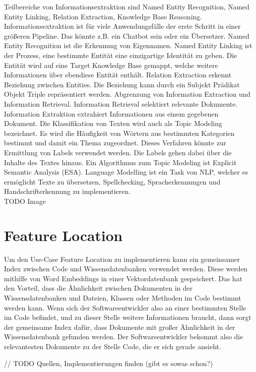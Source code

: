 Teilbereiche von Informationsextraktion sind Named Entity Recognition, Named Entity Linking, Relation Extraction, Knowledge Base Reasoning.
Informationsextraktion ist für viele Anwendungsfälle der erste Schritt in einer größeren Pipeline.
Das könnte z.B. ein Chatbot sein oder ein Übersetzer.
Named Entity Recognition ist die Erkennung von Eigennamen.
Named Entity Linking ist der Prozess, eine bestimmte Entität eine einzigartige Identität zu geben.
Die Entität wird auf eine Target Knowledge Base gemappt, welche weitere Informationen über ebendiese Entität enthält.
Relation Extraction erkennt Beziehung zwischen Entities.
Die Beziehung kann durch ein Subjekt Prädikat Objekt Triple repräsentiert werden.
Abgrenzung von Information Extraction und Information Retrieval.
Information Retrieval selektiert relevante Dokumente.
Information Extraktion extrahiert Informationen aus einem gegebenen Dokument.
Die Klassifikation von Texten wird auch als Topic Modeling bezeichnet.
Es wird die Häufigkeit von Wörtern aus bestimmten Kategorien bestimmt und damit ein Thema zugeordnet.
Dieses Verfahren könnte zur Ermittlung von Labels verwendet werden.
Die Labels gehen dabei über die Inhalte des Textes hinaus.
Ein Algorithmus zum Topic Modeling ist Explicit Semantic Analysis (ESA).
Language Modelling ist ein Task von NLP, welcher es ermöglicht Texte zu übersetzen, Spellchecking, Spracherkennungen und Handschrifterkennung zu implementieren.\\

TODO Image

\section{Feature Location}

Um den Use-Case Feature Location zu implementieren kann ein gemeinsamer Index zwischen Code und Wissensdatenbanken verwendet werden.
Diese werden mithilfe von Word Embeddings in einer Vektordatenbank gespeichert.
Das hat den Vorteil, dass die Ähnlichkeit zwischen Dokumenten in der Wissensdatenbanken und Dateien, Klassen oder Methoden im Code bestimmt werden kann.
Wenn sich der Softwareentwickler also an einer bestimmten Stelle im Code befindet, und zu dieser Stelle weitere Informationen braucht, dann sorgt der gemeinsame Index dafür, dass Dokumente mit großer Ähnlichkeit in der Wissensdatenbank gefunden werden.
Der Softwareentwickler bekommt also die relevantesten Dokumente zu der Stelle Code, die er sich gerade ansieht. 

// TODO Quellen, Implementierungen finden (gibt es sowas schon?)